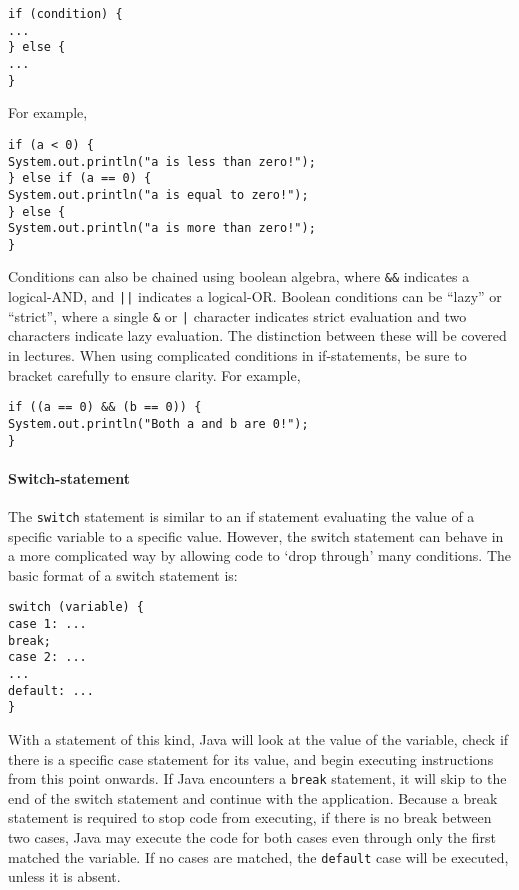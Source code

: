\begin{verbatim}
if (condition) {
...
} else {
...
}
\end{verbatim}

\noindent
For example,

\begin{verbatim}
if (a < 0) {
System.out.println("a is less than zero!");
} else if (a == 0) {
System.out.println("a is equal to zero!");
} else {
System.out.println("a is more than zero!");
}
\end{verbatim}

\noindent
Conditions can also be chained using boolean algebra, where {\tt \&\&} indicates a logical-AND, and {\tt ||} indicates a logical-OR. Boolean conditions can be ``lazy'' or ``strict'', where a single {\tt \&} or {\tt |} character indicates strict evaluation and two characters indicate lazy evaluation. The distinction between these will be covered in lectures. When using complicated conditions in if-statements, be sure to bracket carefully to ensure clarity. For example,

\begin{verbatim}
if ((a == 0) && (b == 0)) {
System.out.println("Both a and b are 0!");
}
\end{verbatim}

\paragraph{Switch-statement}

The {\tt switch} statement is similar to an if statement evaluating the value of a specific variable to a specific value. However, the switch statement can behave in a more complicated way by allowing code to `drop through' many conditions. The basic format of a switch statement is:

\begin{verbatim}
switch (variable) {
case 1: ...
break;
case 2: ...
...
default: ...
}
\end{verbatim}

\noindent
With a statement of this kind, Java will look at the value of the variable, check if there is a specific case statement for its value, and begin executing instructions from this point onwards. If Java encounters a {\tt break} statement, it will skip to the end of the switch statement and continue with the application. Because a break statement is required to stop code from executing, if there is no break between two cases, Java may execute the code for both cases even through only the first matched the variable. If no cases are matched, the {\tt default} case will be executed, unless it is absent.\\

